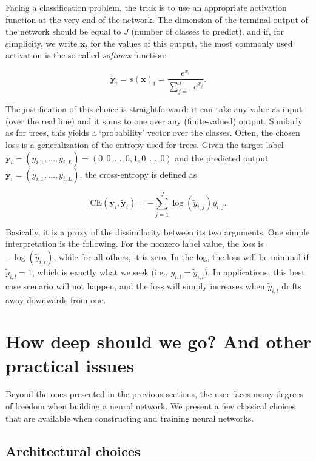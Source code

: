 \documentclass[]{krantz}
\theoremstyle{definition}
\theoremstyle{definition}
\theoremstyle{definition}
\theoremstyle{remark}
\begin{document}
Facing a classification problem, the trick is to use an appropriate
activation function at the very end of the network. The dimension of the
terminal output of the network should be equal to \(J\) (number of
classes to predict), and if, for simplicity, we write \(\textbf{x}_i\)
for the values of this output, the most commonly used activation is the
so-called \emph{softmax} function:

\[\tilde{\textbf{y}}_i=s(\textbf{x})_i=\frac{e^{x_i}}{\sum_{j=1}^Je^{x_j}}.\]

The justification of this choice is straightforward: it can take any
value as input (over the real line) and it sums to one over any
(finite-valued) output. Similarly as for trees, this yields a
`probability' vector over the classes. Often, the chosen loss is a
generalization of the entropy used for trees. Given the target label
\(\textbf{y}_i=(y_{i,1},\dots,y_{i,L})=(0,0,\dots,0,1,0,\dots,0)\) and
the predicted output
\(\tilde{\textbf{y}}_i=(\tilde{y}_{i,1},\dots,\tilde{y}_{i,L})\), the
cross-entropy is defined as

\begin{equation}
\label{eq:crossentropy}
\text{CE}(\textbf{y}_i,\tilde{\textbf{y}}_i)=-\sum_{j=1}^J\log(\tilde{y}_{i,j})y_{i,j}.
\end{equation}

Basically, it is a proxy of the dissimilarity between its two arguments.
One simple interpretation is the following. For the nonzero label value,
the loss is \(-\log(\tilde{y}_{i,l})\), while for all others, it is
zero. In the log, the loss will be minimal if \(\tilde{y}_{i,l}=1\),
which is exactly what we seek (i.e., \(y_{i,l}=\tilde{y}_{i,l}\)). In
applications, this best case scenario will not happen, and the loss will
simply increases when \(\tilde{y}_{i,l}\) drifts away downwards from
one.

\hypertarget{howdeep}{%
\section{How deep should we go? And other practical
issues}\label{howdeep}}

Beyond the ones presented in the previous sections, the user faces many
degrees of freedom when building a neural network. We present a few
classical choices that are available when constructing and training
neural networks.

\hypertarget{architectural-choices}{%
\subsection{Architectural choices}\label{architectural-choices}}
\end{document}
